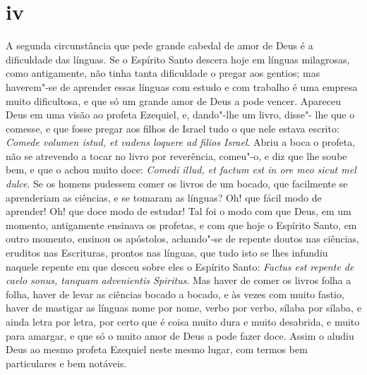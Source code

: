 \section*{iv}

A segunda circunstância que pede grande cabedal de amor de Deus é a
dificuldade das línguas. Se o Espírito Santo descera hoje em línguas
milagrosas, como antigamente, não tinha tanta dificuldade o pregar aos
gentios; mas haverem"-se de aprender essas línguas com estudo e com
trabalho é uma empresa muito dificultosa, e que só um grande amor de
Deus a pode vencer. Apareceu Deus em uma visão ao profeta Ezequiel, e,
dando"-lhe um livro, disse"- lhe que o comesse, e que fosse pregar aos
filhos de Israel tudo o que nele estava escrito: \emph{Comede volumen
istud, et vadens loquere ad filios Israel}. Abriu a boca o %
profeta, não se atrevendo a tocar no livro por reverência, comeu"-o, e
diz que lhe soube bem, e que o achou muito doce: \emph{Comedi illud, et
factum est in ore meo sicut mel dulce}. Se os homens pudessem %
comer os livros de um bocado, que facilmente se aprenderiam as ciências,
e se tomaram as línguas? Oh! que fácil modo de aprender! Oh! que doce
modo de estudar! Tal foi o modo com que Deus, em um momento, antigamente
ensinava os profetas, e com que hoje o Espírito Santo, em outro momento,
ensinou os apóstolos, achando"-se de repente doutos nas ciências,
eruditos nas Escrituras, prontos nas línguas, que tudo isto se lhes
infundiu naquele repente em que
desceu sobre eles o Espírito Santo: \emph{Factus est repente de caelo
sonus, tanquam advenientis Spiritus}. Mas haver de comer os livros folha
a folha, haver de levar as ciências bocado a bocado, e às vezes com
muito fastio, haver de mastigar as línguas nome por nome, verbo por
verbo, sílaba por sílaba, e ainda letra por letra, por certo que é coisa
muito dura e muito desabrida, e muito para amargar, e que só o muito
amor de Deus a pode fazer doce. Assim o aludiu Deus ao mesmo profeta
Ezequiel neste mesmo lugar, com termos bem particulares e bem notáveis.

